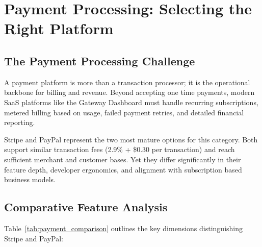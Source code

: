 \section{Payment Processing: Selecting the Right Platform}
\label{sec:payment_selection}

\subsection{The Payment Processing Challenge}

A payment platform is more than a transaction processor; it is the operational backbone for billing and revenue. Beyond accepting one time payments, modern SaaS platforms like the Gateway Dashboard must handle recurring subscriptions, metered billing based on usage, failed payment retries, and detailed financial reporting.

Stripe and PayPal represent the two most mature options for this category. Both support similar transaction fees (2.9\% + \$0.30 per transaction) and reach sufficient merchant and customer bases. Yet they differ significantly in their feature depth, developer ergonomics, and alignment with subscription based business models.

\subsection{Comparative Feature Analysis}

Table~\ref{tab:payment_comparison} outlines the key dimensions distinguishing Stripe and PayPal:

